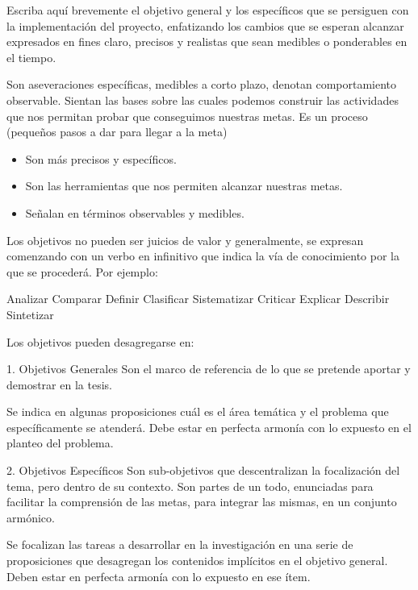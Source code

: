 
\justifying

Escriba aquí brevemente el objetivo general y los específicos que se persiguen con la implementación del proyecto, enfatizando los cambios que se esperan alcanzar expresados en fines claro, precisos y realistas que sean medibles o ponderables en el tiempo.

Son aseveraciones específicas, medibles a corto plazo, denotan comportamiento
observable. Sientan las bases sobre las cuales podemos construir las actividades que nos permitan probar que conseguimos nuestras metas. Es un proceso (pequeños pasos a dar para llegar a la meta)

\begin{itemize}
    \item Son más precisos y específicos.
    \item Son las herramientas que nos permiten alcanzar nuestras metas.
    \item Señalan en términos observables y medibles.
\end{itemize}

Los objetivos no pueden ser juicios de valor y generalmente, se expresan comenzando con un verbo en infinitivo que indica la vía de conocimiento por la que se procederá.
Por ejemplo:

Analizar
Comparar
Definir
Clasificar
Sistematizar
Criticar
Explicar
Describir
Sintetizar

Los objetivos pueden desagregarse en:

1. Objetivos Generales
Son el marco de referencia de lo que se pretende aportar y demostrar en la tesis.

Se indica en algunas proposiciones cuál es el área temática y el problema que
específicamente se atenderá. Debe estar en perfecta armonía con lo expuesto en el planteo del
problema.

2. Objetivos Específicos
Son sub-objetivos que descentralizan la focalización del tema, pero dentro de su contexto.
Son partes de un todo, enunciadas para facilitar la comprensión de las metas, para integrar las mismas, en un conjunto armónico.

Se focalizan las tareas a desarrollar en la investigación en una serie de proposiciones que desagregan los contenidos implícitos en el objetivo general. Deben estar en perfecta armonía con lo expuesto en ese ítem.

